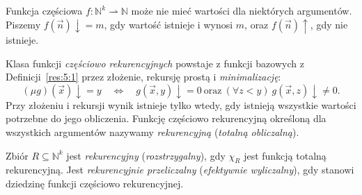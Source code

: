 \begin{definicja}\label{res:5:5}
Funkcja częściowa $f:\mathbb N^k\rightharpoonup\mathbb N$ może nie mieć wartości dla niektórych argumentów. Piszemy $f(\vec n)\downarrow=m$, gdy wartość istnieje i wynosi $m$, oraz $f(\vec n)\uparrow$, gdy nie istnieje.

Klasa funkcji \emph{częściowo rekurencyjnych} powstaje z funkcji bazowych z Definicji~\ref{res:5:1} przez złożenie, rekursję prostą i \emph{minimalizację}:
\[
(\mu g)(\vec x)\downarrow=y\quad\Longleftrightarrow\quad
g(\vec x,y)\downarrow=0\ \text{oraz}\ (\forall z<y)\ g(\vec x,z)\downarrow\ne0.
\]
Przy złożeniu i rekursji wynik istnieje tylko wtedy, gdy istnieją wszystkie wartości potrzebne do jego obliczenia. Funkcję częściowo rekurencyjną określoną dla wszystkich argumentów nazywamy \emph{rekurencyjną} (\emph{totalną obliczalną}).

Zbiór $R\subseteq\mathbb N^k$ jest \emph{rekurencyjny} (\emph{rozstrzygalny}), gdy $\chi_R$ jest funkcją totalną rekurencyjną. Jest \emph{rekurencyjnie przeliczalny} (\emph{efektywnie wyliczalny}), gdy stanowi dziedzinę funkcji częściowo rekurencyjnej.
\end{definicja}


